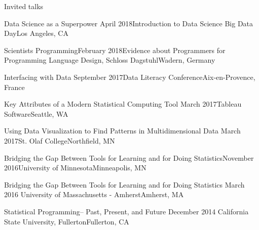 \documentclass{resume} %
\begin{document}
\begin{rSection}{Invited talks}
\begin{sSubsection}{Data Science as a Superpower}{ }{April 2018}{Introduction to Data Science Big Data Day}{Los Angeles, CA}
\end{sSubsection}

\begin{sSubsection}{Scientists Programming}{}{February 2018}{Evidence about Programmers for Programming Language Design, Schloss Dagstuhl}{Wadern, Germany}
\end{sSubsection}

\begin{sSubsection}{Interfacing with Data}{ }{September 2017}{Data Literacy Conference}{Aix-en-Provence, France}
\end{sSubsection}

\begin{sSubsection}{Key Attributes of a Modern Statistical Computing Tool}{ }{March 2017}{Tableau Software}{Seattle, WA}
\end{sSubsection}

\begin{sSubsection}{Using Data Visualization to Find Patterns in Multidimensional Data}{ }{March 2017}{St. Olaf College}{Northfield, MN}
\end{sSubsection}

\begin{sSubsection}{Bridging the Gap Between Tools for Learning and for Doing Statistics}{}{November 2016}{University of Minnesota}{Minneapolis, MN}
\end{sSubsection}

\begin{sSubsection}{Bridging the Gap Between Tools for Learning and for Doing Statistics}{ }{March 2016 }{University of Massachusetts - Amherst}{Amherst, MA}
\end{sSubsection}

\begin{sSubsection}{Statistical Programming-- Past, Present, and Future}{ }{December 2014 }{California State University, Fullerton}{Fullerton, CA}
\end{sSubsection}

\end{rSection}
\end{document}
